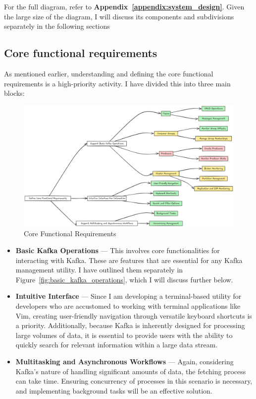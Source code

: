 \documentclass[10pt , a4paper]{report}
\begin{document}
For the full diagram, refer to \textbf{Appendix~\ref{appendix:system_design}}. Given the large size of the diagram, I will discuss its components and subdivisions separately in the following sections

\subsection{Core functional requirements}

As mentioned earlier, understanding and defining the core functional requirements is a high-priority activity. I have divided this into three main blocks:

\begin{figure}[htbp]
    \centering
    \includegraphics[width=1\linewidth]{imgs/CoreFucntionalRequirementsDiagram.png}
    \caption{Core Functional Requirements}
    \label{fig:core_functional_requirements}
\end{figure}

\begin{itemize}
    \item \textbf{Basic Kafka Operations} — This involves core functionalities for interacting with Kafka. These are features that are essential for any Kafka management utility. I have outlined them separately in Figure~\ref{fig:basic_kafka_operations}, which I will discuss further below.
    
    \item \textbf{Intuitive Interface} — Since I am developing a terminal-based utility for developers who are accustomed to working with terminal applications like Vim, creating user-friendly navigation through versatile keyboard shortcuts is a priority. Additionally, because Kafka is inherently designed for processing large volumes of data, it is essential to provide users with the ability to quickly search for relevant information within a large data stream.
    
    \item \textbf{Multitasking and Asynchronous Workflows} — Again, considering Kafka’s nature of handling significant amounts of data, the fetching process can take time. Ensuring concurrency of processes in this scenario is necessary, and implementing background tasks will be an effective solution.
\end{itemize}
\end{document}
